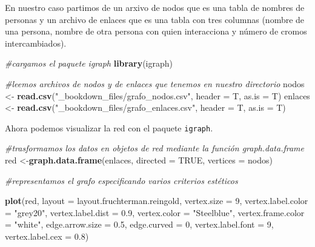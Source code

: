 \documentclass[]{book}
\newenvironment{Shaded}{\begin{snugshade}}{\end{snugshade}}
\newcommand{\CommentTok}[1]{\textcolor[rgb]{0.56,0.35,0.01}{\textit{#1}}}
\newcommand{\DataTypeTok}[1]{\textcolor[rgb]{0.13,0.29,0.53}{#1}}
\newcommand{\DecValTok}[1]{\textcolor[rgb]{0.00,0.00,0.81}{#1}}
\newcommand{\FloatTok}[1]{\textcolor[rgb]{0.00,0.00,0.81}{#1}}
\newcommand{\KeywordTok}[1]{\textcolor[rgb]{0.13,0.29,0.53}{\textbf{#1}}}
\newcommand{\NormalTok}[1]{#1}
\newcommand{\OtherTok}[1]{\textcolor[rgb]{0.56,0.35,0.01}{#1}}
\newcommand{\StringTok}[1]{\textcolor[rgb]{0.31,0.60,0.02}{#1}}
\theoremstyle{definition}
\theoremstyle{definition}
\theoremstyle{definition}
\theoremstyle{remark}
\begin{document}
En nuestro caso partimos de un arxivo de nodos que es una tabla de
nombres de personas y un archivo de enlaces que es una tabla con tres
columnas (nombre de una persona, nombre de otra persona con quien
interacciona y número de cromos intercambiados).

\begin{Shaded}
\begin{Highlighting}[]
\CommentTok{#cargamos el paquete igraph}
\KeywordTok{library}\NormalTok{(igraph)}

\CommentTok{#leemos archivos de nodos y de enlaces que tenemos en nuestro directorio}
\NormalTok{nodos <-}\StringTok{ }\KeywordTok{read.csv}\NormalTok{(}\StringTok{"_bookdown_files/grafo_nodos.csv"}\NormalTok{, }\DataTypeTok{header =}\NormalTok{ T, }\DataTypeTok{as.is =}\NormalTok{ T)}
\NormalTok{enlaces <-}\StringTok{ }\KeywordTok{read.csv}\NormalTok{(}\StringTok{"_bookdown_files/grafo_enlaces.csv"}\NormalTok{, }\DataTypeTok{header =}\NormalTok{ T, }\DataTypeTok{as.is =}\NormalTok{ T)}
\end{Highlighting}
\end{Shaded}

Ahora podemos visualizar la red con el paquete \texttt{igraph}.

\begin{Shaded}
\begin{Highlighting}[]
\CommentTok{#trasformamos los datos en objetos de red mediante la función graph.data.frame}
\NormalTok{red <-}\KeywordTok{graph.data.frame}\NormalTok{(enlaces, }\DataTypeTok{directed =} \OtherTok{TRUE}\NormalTok{, }\DataTypeTok{vertices =}\NormalTok{ nodos)}

\CommentTok{#representamos el grafo especificando varios criterios estéticos}

\KeywordTok{plot}\NormalTok{(red, }\DataTypeTok{layout =}\NormalTok{ layout.fruchterman.reingold, }\DataTypeTok{vertex.size =} \DecValTok{9}\NormalTok{, }
     \DataTypeTok{vertex.label.color =} \StringTok{"grey20"}\NormalTok{, }\DataTypeTok{vertex.label.dist =} \FloatTok{0.9}\NormalTok{, }
     \DataTypeTok{vertex.color =} \StringTok{"Steelblue"}\NormalTok{, }\DataTypeTok{vertex.frame.color =} \StringTok{"white"}\NormalTok{, }
     \DataTypeTok{edge.arrow.size =} \FloatTok{0.5}\NormalTok{, }\DataTypeTok{edge.curved =} \DecValTok{0}\NormalTok{, }\DataTypeTok{vertex.label.font =} \DecValTok{9}\NormalTok{, }
     \DataTypeTok{vertex.label.cex =} \FloatTok{0.8}\NormalTok{)}
\end{Highlighting}
\end{Shaded}
\end{document}
